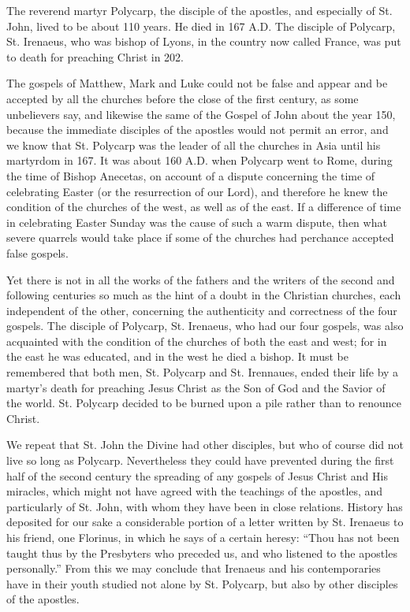 The reverend martyr Polycarp, the disciple of the apostles, and especially of St. John, lived to be about 110 years. He died in 167 A.D. The disciple of Polycarp, St. Irenaeus, who was bishop of Lyons, in the country now called France, was put to death for preaching Christ in 202.

The gospels of Matthew, Mark and Luke could not be false and appear and be accepted by all the churches before the close of the first century, as some unbelievers say, and likewise the same of the Gospel of John about the year 150, because the immediate disciples of the apostles would not permit an error, and we know that St. Polycarp was the leader of all the churches in Asia until his martyrdom in 167. It was about 160 A.D. when Polycarp went to Rome, during the time of Bishop Anecetas, on account of a dispute concerning the time of celebrating Easter (or the resurrection of our Lord), and therefore he knew the condition of the churches of the west, as well as of the east. If a difference of time in celebrating Easter Sunday was the cause of such a warm dispute, then what severe quarrels would take place if some of the churches had perchance accepted false gospels.

Yet there is not in all the works of the fathers and the writers of the second and following centuries so much as the hint of a doubt in the Christian churches, each independent of the other, concerning the authenticity and correctness of the four gospels. The disciple of Polycarp, St. Irenaeus, who had our four gospels, was also acquainted with the condition of the churches of both the east and west; for in the east he was educated, and in the west he died a bishop. It must be remembered that both men, St. Polycarp and St. Irennaues, ended their life by a martyr's death for preaching Jesus Christ as the Son of God and the Savior of the world. St. Polycarp decided to be burned upon a pile rather than to renounce Christ.

We repeat that St. John the Divine had other disciples, but who of course did not live so long as Polycarp. Nevertheless they could have prevented during the first half of the second century the spreading of any gospels of Jesus Christ and His miracles, which might not have agreed with the teachings of the apostles, and particularly of St. John, with whom they have been in close relations. History has deposited for our sake a considerable portion of a letter written by St. Irenaeus to his friend, one Florinus, in which he says of a certain heresy: ``Thou has not been taught thus by the Presbyters who preceded us, and who listened to the apostles personally.'' From this we may conclude that Irenaeus and his contemporaries have in their youth studied not alone by St. Polycarp, but also by other disciples of the apostles.

